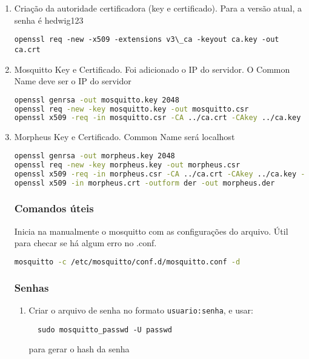 \begin{enumerate}
\item
Criação da autoridade certificadora (key e certificado). Para a versão atual, a senha é hedwig123

\lstinline{openssl req -new -x509 -extensions v3\_ca -keyout ca.key -out ca.crt}
\item
Mosquitto Key e Certificado. Foi adicionado o IP do servidor. O Common Name deve ser o IP do servidor

\begin{lstlisting}[language=bash]
openssl genrsa -out mosquitto.key 2048
openssl req -new -key mosquitto.key -out mosquitto.csr
openssl x509 -req -in mosquitto.csr -CA ../ca.crt -CAkey ../ca.key -CAcreateserial -out mosquitto.crt -days 3650 -sha256    
\end{lstlisting}

\item
Morpheus Key e Certificado. Common Name será localhost

\begin{lstlisting}[language=bash]
openssl genrsa -out morpheus.key 2048
openssl req -new -key morpheus.key -out morpheus.csr
openssl x509 -req -in morpheus.csr -CA ../ca.crt -CAkey ../ca.key -CAcreateserial -out morpheus.crt -days 3650 -sha256 -addtrust clientAuth
openssl x509 -in morpheus.crt -outform der -out morpheus.der    
\end{lstlisting}

\subsubsection{Comandos úteis}
Inicia na manualmente o mosquitto com as configurações do arquivo. Útil para checar se há algum erro no .conf.
\begin{lstlisting}[language=bash]
mosquitto -c /etc/mosquitto/conf.d/mosquitto.conf -d
\end{lstlisting}

\subsubsection{Senhas}
\begin{enumerate}
\item Criar o arquivo de senha no formato \lstinline{usuario:senha}, e usar:

\begin{lstlisting}
  sudo mosquitto_passwd -U passwd
\end{lstlisting}
para gerar o hash da senha


\end{enumerate}
\end{enumerate}
